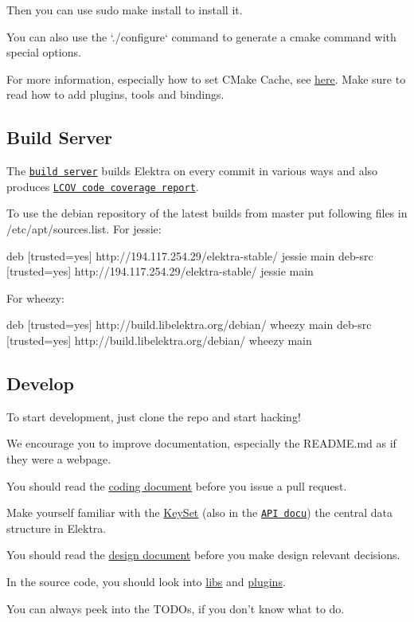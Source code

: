 Then you can use {\ttfamily sudo make install} to install it.

You can also use the `./configure` command to generate a {\ttfamily cmake} command with special options.

For more information, especially how to set C\+Make Cache, see \hyperlink{doc_COMPILE_md}{here}. Make sure to read how to add plugins, tools and bindings.

\subsection*{Build Server}

The \href{http://build.libelektra.org:8080/}{\tt build server} builds Elektra on every commit in various ways and also produces \href{http://doc.libelektra.org/coverage/latest}{\tt L\+C\+O\+V code coverage report}.

To use the debian repository of the latest builds from master put following files in /etc/apt/sources.list. For jessie\+: \begin{DoxyVerb}    deb     [trusted=yes] http://194.117.254.29/elektra-stable/ jessie main
    deb-src [trusted=yes] http://194.117.254.29/elektra-stable/ jessie main
\end{DoxyVerb}


For wheezy\+: \begin{DoxyVerb}     deb     [trusted=yes] http://build.libelektra.org/debian/ wheezy main
     deb-src [trusted=yes] http://build.libelektra.org/debian/ wheezy main
\end{DoxyVerb}


\subsection*{Develop}

To start development, just clone the repo and start hacking!


\begin{DoxyItemize}
\item We encourage you to improve documentation, especially the R\+E\+A\+D\+M\+E.\+md as if they were a webpage.
\item You should read the \hyperlink{doc_CODING_md}{coding document} before you issue a pull request.
\item Make yourself familiar with the \hyperlink{md_doc_help_elektra-data-structures_doc_help_elektra-data-structures_md}{Key\+Set} (also in the \href{http://doc.libelektra.org/api/latest/html/group__keyset.html}{\tt A\+P\+I docu}) the central data structure in Elektra.
\item You should read the \hyperlink{doc_DESIGN_md}{design document} before you make design relevant decisions.
\item In the source code, you should look into \hyperlink{md_src_libs_README_src_libs_README_md}{libs} and \hyperlink{md_src_plugins_README_src_plugins_README_md}{plugins}.
\item You can always peek into the T\+O\+D\+Os, if you don't know what to do. 
\end{DoxyItemize}